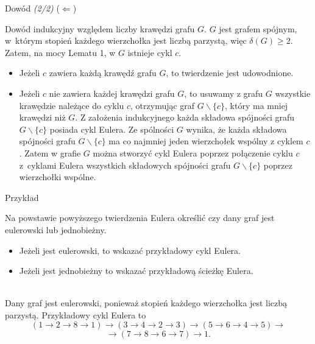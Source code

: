 \documentclass[a4paper,10pt]{beamer}
\begin{document}
\begin{frame}

\begin{block}{Dowód {\it (2/2)}}
($\Leftarrow$)

Dowód indukcyjny względem liczby krawędzi grafu $G$. $G$ jest grafem spójnym, w~którym stopień każdego wierzchołka jest liczbą parzystą, więc $\delta(G)\geqslant2$. Zatem, na mocy Lematu 1, w $G$ istnieje cykl $c$.
\begin{itemize}
\item Jeżeli $c$ zawiera każdą krawędź grafu $G$, to twierdzenie jest udowodnione.
\item Jeżeli $c$ nie zawiera każdej krawędzi grafu $G$, to usuwamy z grafu $G$ wszystkie krawędzie należące do cyklu $c$, otrzymując graf $G\backslash\{c\}$, który ma mniej krawędzi niż $G$. Z założenia indukcyjnego każda składowa spójności grafu $G\backslash\{c\}$ posiada cykl Eulera. Ze spólności $G$ wynika, że każda składowa spójności grafu $G\backslash\{c\}$ ma co najmniej jeden wierzchołek wspólny z cyklem $c$. Zatem w grafie $G$ można stworzyć cykl Eulera poprzez połączenie cyklu $c$ z~cyklami Eulera wszystkich składowych spójności grafu $G\backslash\{c\}$ poprzez wierzchołki wspólne.
\end{itemize}
\end{block}
\end{frame}


\begin{frame}
	
	\begin{exampleblock}{Przykład}
		\begin{minipage}{.4\textwidth}
			\begin{center}
			
			\end{center}
		\end{minipage}
		\begin{minipage}{.55\textwidth}
				Na powstawie powyższego twierdzenia Eulera określić czy dany graf jest eulerowski lub jednobieżny.

\medskip
\begin{itemize}
\item Jeżeli jest eulerowski, to wskazać przykładowy cykl Eulera.
\item Jeżeli jest jednobieżny to wskazać przykładową ścieżkę Eulera.
\end{itemize}
		\end{minipage}\\
	\vspace{0.3cm}
Dany graf jest eulerowski, ponieważ stopień każdego wierzchołka jest liczbą parzystą. Przykładowy cykl Eulera to $$(1\to2\to8\to1)\to(3\to4\to2\to3)\to(5\to6\to4\to5)\to$$ $$\to(7\to8\to6\to7)\to1.$$
	\end{exampleblock}
	
\end{frame}
\end{document}
